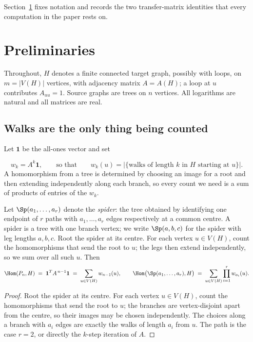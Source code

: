 Section~\ref{sec:prelim} fixes notation and records the two
transfer-matrix identities that every computation in the paper rests on.

\section{Preliminaries}
\label{sec:prelim}

Throughout, $H$ denotes a finite connected target graph, possibly with
loops, on $m = |V(H)|$ vertices, with adjacency matrix $A = A(H)$; a
loop at $u$ contributes $A_{uu} = 1$. Source graphs are trees on $n$
vertices. All logarithms are natural and all matrices are real.

\subsection{Walks are the only thing being counted}

Let $\mathbf{1}$ be the all-ones vector and set

\[
  w_k = A^k \mathbf{1},
  \qquad\text{so that}\qquad
  w_k(u) = \bigl|\{\text{walks of length } k \text{ in } H \text{ starting at } u\}\bigr|.
\]
A homomorphism from a tree is determined by choosing an image for a root
and then extending independently along each branch, so every count we
need is a sum of products of entries of the $w_k$.

\begin{lemma}
  \label{lem:transfer}
  Let $\Sp(a_1,\dots,a_r)$ denote the \emph{spider}: the tree obtained by
  identifying one endpoint of $r$ paths with $a_1, \dots, a_r$ edges
  respectively at a common centre. A spider is a tree with one branch
  vertex; we write $\Sp(a,b,c)$ for the spider with leg lengths $a,b,c$.
  Root the spider at its centre. For each vertex $u \in V(H)$, count the
  homomorphisms that send the root to $u$; the legs then extend
  independently, so we sum over all such $u$.
  Then
  \[
    \Hom(P_n, H) \;=\; \mathbf{1}^{T} A^{\,n-1} \mathbf{1}
      \;=\; \sum_{u \in V(H)} w_{n-1}(u),
    \qquad
    \Hom\bigl(\Sp(a_1,\dots,a_r), H\bigr)
      \;=\; \sum_{u \in V(H)} \prod_{i=1}^{r} w_{a_i}(u).
  \]
\end{lemma}

\begin{proof}
  Root the spider at its centre. For each vertex $u \in V(H)$, count the
  homomorphisms that send the root to $u$; the branches are vertex-disjoint
  apart from the centre, so their images may be chosen independently. The
  choices along a branch with $a_i$ edges are exactly the walks of length
  $a_i$ from $u$. The path is the case $r = 2$, or directly the $k$-step
  iteration of $A$.
\end{proof}

